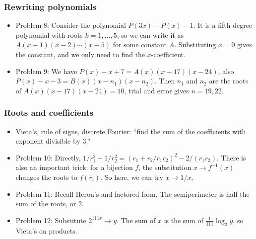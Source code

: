 \documentclass[10pt,paper=letter]{scrartcl}
\begin{document}
\subsubsection*{Rewriting polynomials}

\begin{itemize}
  \item Problem 8: Consider the polynomial $P(3x) - P(x) - 1$. It is a fifth-degree polynomial with roots $k = 1, \ldots, 5$, so we can write it as $A(x-1)(x-2)\cdots(x-5)$ for some constant $A$. Substituting $x=0$ gives the constant, and we only need to find the $x$-coefficient.
  \item Problem 9: We have $P(x) - x + 7 = A(x)(x-17)(x-24)$, also $P(x) - x - 3 = B(x)(x-n_1)(x-n_2)$. Then $n_1$ and $n_2$ are the roots of $A(x)(x-17)(x-24) = 10$, trial and error gives $n = 19, 22$.
\end{itemize}

\subsubsection*{Roots and coefficients}

\begin{itemize}
  \item Vieta's, rule of signs, discrete Fourier: ``find the sum of the coefficients with exponent divisible by 3.''
  \item Problem 10: Directly, $1/r_1^2 + 1/r_2^2 = (r_1 + r_2/r_1r_2)^2 - 2/(r_1r_2)$. There is also an important trick: for a bijection $f$, the substitution $x \to f^{-1}(x)$ changes the roots to $f(r_i)$. So here, we can try $x \to 1/x$. 
  \item Problem 11: Recall Heron's and factored form. The semiperimeter is half the sum of the roots, or $2$. 
  \item Problem 12: Substitute $2^{111x} \to y$. The sum of $x$ is the sum of $\frac1{111} \log_2 y$, so Vieta's on products.
\end{itemize}
\end{document}
